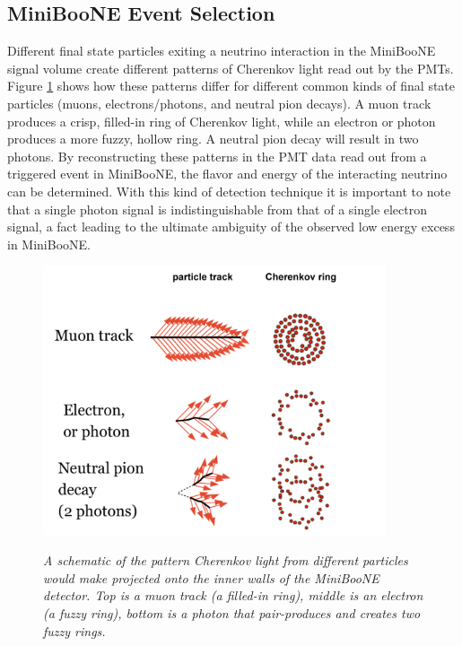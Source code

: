 \subsection{MiniBooNE Event Selection}

Different final state particles exiting a neutrino interaction in the MiniBooNE signal volume create different patterns of Cherenkov light read out by the PMTs. Figure \ref{georgia_cherenkov_cartoon_fig} \cite{GeorgiaThesis} shows how these patterns differ for different common kinds of final state particles (muons, electrons/photons, and neutral pion decays). A muon track produces a crisp, filled-in ring of Cherenkov light, while an electron or photon produces a more fuzzy, hollow ring. A neutral pion decay will result in two photons. By reconstructing these patterns in the PMT data read out from a triggered event in MiniBooNE, the flavor and energy of the interacting neutrino can be determined. With this kind of detection technique it is important to note that a single photon signal is indistinguishable from that of a single electron signal, a fact leading to the ultimate ambiguity of the observed low energy excess in MiniBooNE.\\

\begin{figure}[ht!]
\centering
	\includegraphics[width=0.9\textwidth]{Figures/georgia_cherenkov_cartoon.png} \\
\caption{\textit{A schematic of the pattern Cherenkov light from different particles would make projected onto the inner walls of the MiniBooNE detector. Top is a muon track (a filled-in ring), middle is an electron (a fuzzy ring), bottom is a photon that pair-produces and creates two fuzzy rings.}}\label{georgia_cherenkov_cartoon_fig}
\end{figure}

